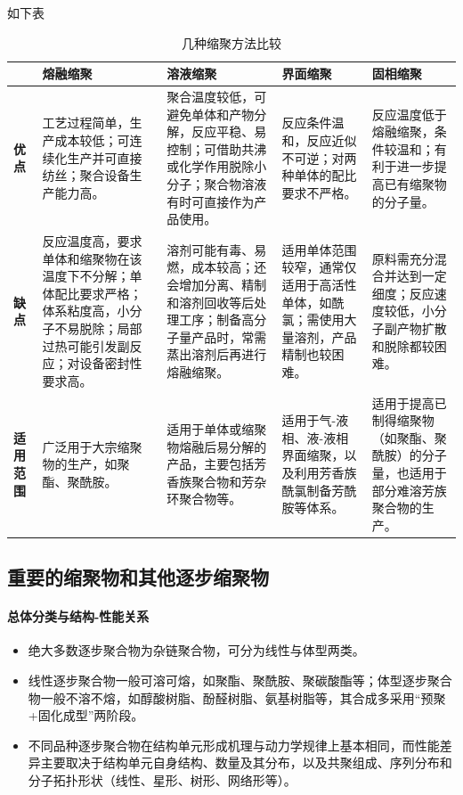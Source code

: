 ﻿\documentclass[12pt,a4paper]{article}
\renewcommand{\arraystretch}{1.18}
\begin{document}
如下表
\begin{table}[!htbp]
\centering
\caption{几种缩聚方法比较}
\label{tab:polymerization_methods}
{\small
\setlength{\tabcolsep}{4pt}
\renewcommand{\arraystretch}{1.22}
\begin{tabularx}{\textwidth}{C{1.8cm}YYYY}
\toprule
{}
 & \textbf{熔融缩聚} & \textbf{溶液缩聚} & \textbf{界面缩聚} & \textbf{固相缩聚} \\
\midrule
\textbf{优点} &
工艺过程简单，生产成本较低；可连续化生产并可直接纺丝；聚合设备生产能力高。 &
聚合温度较低，可避免单体和产物分解，反应平稳、易控制；可借助共沸或化学作用脱除小分子；聚合物溶液有时可直接作为产品使用。 &
反应条件温和，反应近似不可逆；对两种单体的配比要求不严格。 &
反应温度低于熔融缩聚，条件较温和；有利于进一步提高已有缩聚物的分子量。 \\
\midrule
\textbf{缺点} &
反应温度高，要求单体和缩聚物在该温度下不分解；单体配比要求严格；体系粘度高，小分子不易脱除；局部过热可能引发副反应；对设备密封性要求高。 &
溶剂可能有毒、易燃，成本较高；还会增加分离、精制和溶剂回收等后处理工序；制备高分子量产品时，常需蒸出溶剂后再进行熔融缩聚。 &
适用单体范围较窄，通常仅适用于高活性单体，如酰氯；需使用大量溶剂，产品精制也较困难。 &
原料需充分混合并达到一定细度；反应速度较低，小分子副产物扩散和脱除都较困难。 \\
\midrule
\textbf{适用范围} &
广泛用于大宗缩聚物的生产，如聚酯、聚酰胺。 &
适用于单体或缩聚物熔融后易分解的产品，主要包括芳香族聚合物和芳杂环聚合物等。 &
适用于气-液相、液-液相界面缩聚，以及利用芳香族酰氯制备芳酰胺等体系。 &
适用于提高已制得缩聚物（如聚酯、聚酰胺）的分子量，也适用于部分难溶芳族聚合物的生产。 \\
\bottomrule
\end{tabularx}
}
\end{table}
\FloatBarrier
\subsection{重要的缩聚物和其他逐步缩聚物}
\paragraph{总体分类与结构-性能关系}
\begin{itemize}
  \item 绝大多数逐步聚合物为杂链聚合物，可分为线性与体型两类。
  \item 线性逐步聚合物一般可溶可熔，如聚酯、聚酰胺、聚碳酸酯等；体型逐步聚合物一般不溶不熔，如醇酸树脂、酚醛树脂、氨基树脂等，其合成多采用“预聚+固化成型”两阶段。
  \item 不同品种逐步聚合物在结构单元形成机理与动力学规律上基本相同，而性能差异主要取决于结构单元自身结构、数量及其分布，以及共聚组成、序列分布和分子拓扑形状（线性、星形、树形、网络形等）。
\end{itemize}
\end{document}
